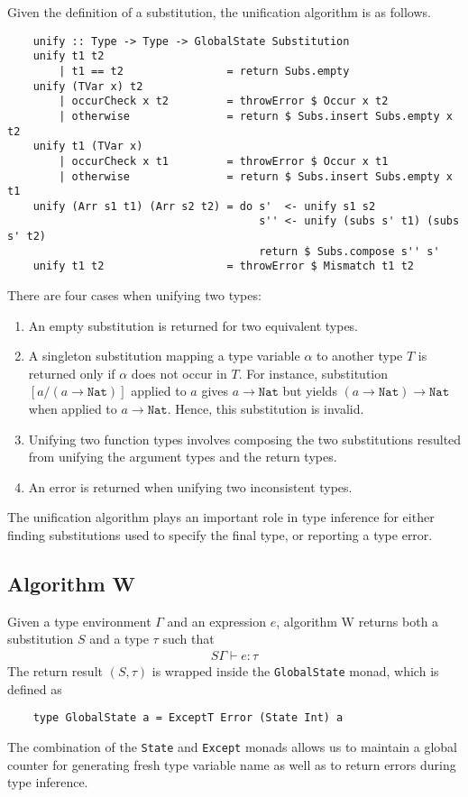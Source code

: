 Given the definition of a substitution, the unification algorithm is as follows.
\begin{lstlisting}
    unify :: Type -> Type -> GlobalState Substitution
    unify t1 t2 
        | t1 == t2                = return Subs.empty
    unify (TVar x) t2
        | occurCheck x t2         = throwError $ Occur x t2
        | otherwise               = return $ Subs.insert Subs.empty x t2
    unify t1 (TVar x) 
        | occurCheck x t1         = throwError $ Occur x t1
        | otherwise               = return $ Subs.insert Subs.empty x t1
    unify (Arr s1 t1) (Arr s2 t2) = do s'  <- unify s1 s2 
                                       s'' <- unify (subs s' t1) (subs s' t2)
                                       return $ Subs.compose s'' s'
    unify t1 t2                   = throwError $ Mismatch t1 t2
\end{lstlisting}
There are four cases when unifying two types: 
\begin{enumerate}
    \item An empty substitution is returned for two equivalent types.
    \item A singleton substitution mapping a type variable $\alpha$ 
    to another type $T$ is returned only if $\alpha$ does not occur in $T$. For instance, 
    substitution $[a/(a \rightarrow \texttt{Nat})]$ applied to $a$ gives 
    $a \rightarrow \texttt{Nat}$ but yields $(a \rightarrow \texttt{Nat}) \rightarrow \texttt{Nat}$ 
    when applied to $a \rightarrow \texttt{Nat}$. Hence, this substitution 
    is invalid.
    \item  Unifying two function types involves composing the two substitutions 
    resulted from unifying the argument types and the return types.
    \item An error is returned when unifying two inconsistent types. 
\end{enumerate} 

The unification algorithm plays an important role in type inference for 
either finding substitutions used to specify the final type, or reporting a type 
error.

\subsection{Algorithm W}
Given a type environment $\Gamma$ and an expression $e$, algorithm W 
returns both a substitution $S$ and a type $\tau$ such that 
\begin{align*}
    S\Gamma \vdash e : \tau
\end{align*}
The return result $(S, \tau)$ is wrapped inside the \lstinline{GlobalState} 
monad, which is defined as 
\begin{lstlisting}
    type GlobalState a = ExceptT Error (State Int) a
\end{lstlisting}
The combination of the \lstinline{State} and \lstinline{Except} monads
allows us to maintain a global counter for generating fresh type variable name 
as well as to return errors during type inference.

